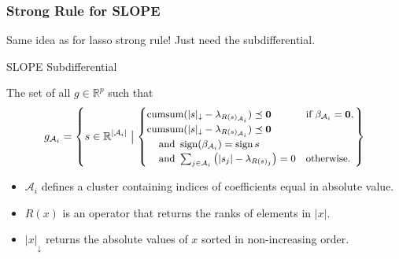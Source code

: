 \documentclass[10pt]{beamer}
\begin{document}
\begin{frame}[c]
  \frametitle{Strong Rule for SLOPE}

  Same idea as for lasso strong rule! Just need the subdifferential.

  \begin{block}{SLOPE Subdifferential}

    The set of all \(g \in \mathbb{R}^p\) such that
    \[
      \small
      g_{\mathcal{A}_i} =
      \left\{s \in \mathbb{R}^{|{\mathcal{A}_i}|} \bigm\vert
        \begin{cases}
          \mathop{\mathrm{cumsum}}(|s|_\downarrow - \lambda_{R(s)_{\mathcal{A}_i}}) \preceq \mathbf{0} & \text{if } \beta_{\mathcal{A}_i} = \mathbf{0}, \\
          \mathop{\mathrm{cumsum}}(|s|_\downarrow - \lambda_{R(s)_{\mathcal{A}_i}}) \preceq \mathbf{0}                                                  \\
          \quad\,\text{and } \operatorname{sign}(\beta_{\mathcal{A}_i}) = \operatorname{sign} s                                                                                     \\
          \quad\,\text{and } \sum_{j \in \mathcal{A}_i}\left(|s_j| - \lambda_{R(s)_j}\right) = 0       & \text{otherwise.}
        \end{cases}
      \right\}
    \]
  \end{block}

  \medskip

  \begin{itemize}
    \item \(\mathcal{A}_i\) defines a \alert{cluster} containing indices of coefficients
          equal in absolute value.
    \item \(R(x)\) is an operator that returns the \alert{ranks} of elements in \(|x|\).
    \item \(|x|_\downarrow\) returns the absolute values of \(x\) sorted in non-increasing
          order.
  \end{itemize}

\end{frame}
\end{document}
